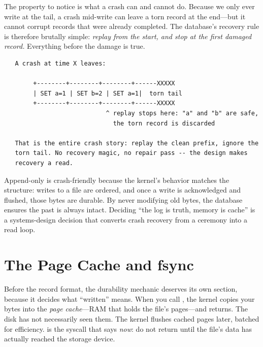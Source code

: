 The property to notice is what a crash can and cannot do. Because we
only ever write at the tail, a crash mid-write can leave a torn record
at the end---but it cannot corrupt records that were already
completed. The database's recovery rule is therefore brutally simple:
\emph{replay from the start, and stop at the first damaged record.}
Everything before the damage is true.

\begin{verbatim}
   A crash at time X leaves:

        +--------+--------+--------+------XXXXX
        | SET a=1 | SET b=2 | SET a=1|  torn tail
        +--------+--------+--------+------XXXXX
                            ^ replay stops here: "a" and "b" are safe,
                              the torn record is discarded

   That is the entire crash story: replay the clean prefix, ignore the
   torn tail. No recovery magic, no repair pass -- the design makes
   recovery a read.
\end{verbatim}

\begin{osconcept}
Append-only is crash-friendly because the kernel's behavior matches
the structure: writes to a file are ordered, and once a write is
acknowledged and flushed, those bytes are durable. By never modifying
old bytes, the database ensures the past is always intact. Deciding
``the log is truth, memory is cache'' is a systems-design decision that
converts crash recovery from a ceremony into a read loop.
\end{osconcept}

\section{The Page Cache and fsync}

Before the record format, the durability mechanic deserves its own
section, because it decides what ``written'' means. When you call
, the kernel copies your bytes into the
\emph{page cache}---RAM that holds the file's pages---and returns. The
disk has not necessarily seen them. The kernel flushes cached pages
later, batched for efficiency.  is the syscall that
says \emph{now}: do not return until the file's data has actually
reached the storage device.

